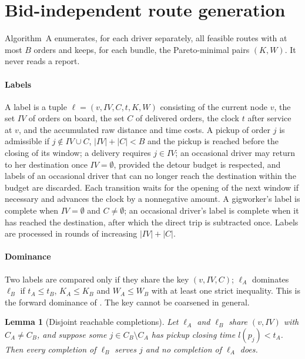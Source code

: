 \documentclass[review,12pt]{elsarticle}
\newtheorem{lemma}[theorem]{Lemma}
\theoremstyle{definition}
\theoremstyle{remark}
\begin{document}
\section{Bid-independent route generation}
\label{sec:algA}

Algorithm~A enumerates, for each driver separately, all feasible routes
with at most $B$ orders and keeps, for each bundle, the Pareto-minimal
pairs $(K,W)$. It never reads a report.

\paragraph{Labels} A label is a tuple $\ell=(v,IV,C,t,K,W)$ consisting of
the current node $v$, the set $IV$ of orders on board, the set $C$ of
delivered orders, the clock $t$ after service at $v$, and the accumulated
raw distance and time costs. A pickup of order $j$ is admissible if
$j\notin IV\cup C$, $|IV|+|C|<B$ and the pickup is reached before the
closing of its window; a delivery requires $j\in IV$; an occasional driver
may return to her destination once $IV=\emptyset$, provided the detour
budget is respected, and labels of an occasional driver that can no longer
reach the destination within the budget are discarded. Each transition waits
for the opening of the next window if necessary and advances the clock by
a nonnegative amount. A gigworker's label is complete when $IV=\emptyset$
and $C\neq\emptyset$; an occasional driver's label is complete when it has
reached the destination, after which the direct trip is subtracted once.
Labels are processed in rounds of increasing $|IV|+|C|$.

\paragraph{Dominance} Two labels are compared only if they share the key
$(v,IV,C)$; $\ell_A$ dominates $\ell_B$ if $t_A\le t_B$, $K_A\le K_B$ and
$W_A\le W_B$ with at least one strict inequality. This is the forward
dominance of \citet{dumas1991pickup}. The key cannot be coarsened in
general.

\begin{lemma}[Disjoint reachable completions]
\label{lem:disjoint}
Let $\ell_A$ and $\ell_B$ share $(v,IV)$ with $C_A\ne C_B$, and suppose some
$j\in C_B\setminus C_A$ has pickup closing time $l(p_j)<t_A$. Then every
completion of $\ell_B$ serves $j$ and no completion of $\ell_A$ does.
\end{lemma}
\end{document}
